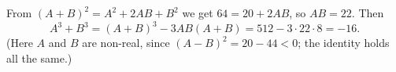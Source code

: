 From $(A+B)^2=A^2+2AB+B^2$ we get $64=20+2AB$, so $AB=22$. Then
\[A^3+B^3=(A+B)^3-3AB(A+B)=512-3\cdot22\cdot8=\boxed{-16}.\]
(Here $A$ and $B$ are non-real, since $(A-B)^2=20-44<0$; the identity holds all the same.)
